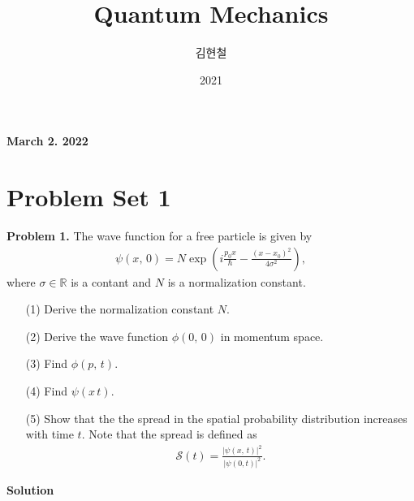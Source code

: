 \documentclass[floatfix,nofootinbib,superscriptaddress,fleqn]{revtex4}
\begin{document}
\title{\Large Quantum Mechanics}
\author{김현철}
\date{2021}

\maketitle

 \textbf{\color{red} March 2. 2022} \\ 
\vspace{2cm}

\section*{\large Problem Set 1}
\noindent \textbf{Problem 1.}
The wave function for a free particle is given by
\begin{align*}
\psi(x,\,0) = N \exp\left( i\frac{p_0 x}{\hbar}  -\frac{(x-x_0)^2}{4\sigma^2} \right),   
\end{align*}
where $\sigma \in \mathbb{R}$ is a contant and $N$ is a normalization
constant. 
\begin{itemize}
\item[(1)] Derive the normalization constant $N$.  
\item[(2)] Derive the wave function $\phi(0,\,0)$ in momentum space. 
\item[(3)] Find $\phi(p,\,t)$.
\item[(4)] Find $\psi(x\,t)$.
\item[(5)] Show that the the spread in the spatial probability
  distribution increases with time $t$. Note that the spread is
  defined as 
  \begin{align*}
\mathcal{S}(t) = \frac{|\psi(x,\,t)|^2}{|\psi(0,t)|^2}.    
  \end{align*}
\end{itemize}
\noindent \textbf{Solution}
\end{document}
